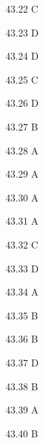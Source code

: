\begin{Solution}{43.{22}}
C
\end{Solution}
\begin{Solution}{43.{23}}
D
\end{Solution}
\begin{Solution}{43.{24}}
D
\end{Solution}
\begin{Solution}{43.{25}}
C
\end{Solution}
\begin{Solution}{43.{26}}
D
\end{Solution}
\begin{Solution}{43.{27}}
B
\end{Solution}
\begin{Solution}{43.{28}}
A
\end{Solution}
\begin{Solution}{43.{29}}
A
\end{Solution}
\begin{Solution}{43.{30}}
A
\end{Solution}
\begin{Solution}{43.{31}}
A
\end{Solution}
\begin{Solution}{43.{32}}
C
\end{Solution}
\begin{Solution}{43.{33}}
D
\end{Solution}
\begin{Solution}{43.{34}}
A
\end{Solution}
\begin{Solution}{43.{35}}
B
\end{Solution}
\begin{Solution}{43.{36}}
B
\end{Solution}
\begin{Solution}{43.{37}}
D
\end{Solution}
\begin{Solution}{43.{38}}
B
\end{Solution}
\begin{Solution}{43.{39}}
A
\end{Solution}
\begin{Solution}{43.{40}}
B
\end{Solution}
